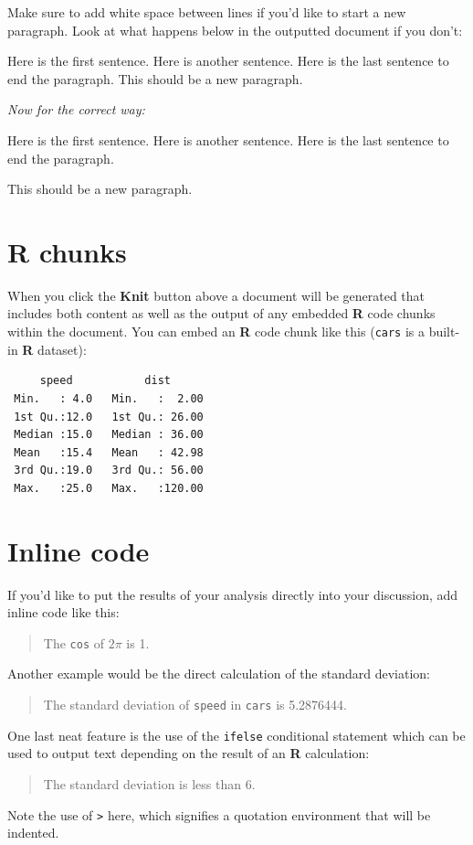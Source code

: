 \documentclass[12pt,twoside]{reedthesis}
\begin{document}
Make sure to add white space between lines if you'd like to start a new paragraph. Look at what happens below in the outputted document if you don't:

Here is the first sentence. Here is another sentence. Here is the last sentence to end the paragraph.
This should be a new paragraph.

\emph{Now for the correct way:}

Here is the first sentence. Here is another sentence. Here is the last sentence to end the paragraph.

This should be a new paragraph.

\hypertarget{r-chunks}{%
\section{R chunks}\label{r-chunks}}

When you click the \textbf{Knit} button above a document will be generated that includes both content as well as the output of any embedded \textbf{R} code chunks within the document. You can embed an \textbf{R} code chunk like this (\texttt{cars} is a built-in \textbf{R} dataset):
\begin{verbatim}
     speed           dist       
 Min.   : 4.0   Min.   :  2.00  
 1st Qu.:12.0   1st Qu.: 26.00  
 Median :15.0   Median : 36.00  
 Mean   :15.4   Mean   : 42.98  
 3rd Qu.:19.0   3rd Qu.: 56.00  
 Max.   :25.0   Max.   :120.00  
\end{verbatim}
\hypertarget{inline-code}{%
\section{Inline code}\label{inline-code}}

If you'd like to put the results of your analysis directly into your discussion, add inline code like this:
\begin{quote}
The \texttt{cos} of \(2 \pi\) is 1.
\end{quote}
Another example would be the direct calculation of the standard deviation:
\begin{quote}
The standard deviation of \texttt{speed} in \texttt{cars} is 5.2876444.
\end{quote}
One last neat feature is the use of the \texttt{ifelse} conditional statement which can be used to output text depending on the result of an \textbf{R} calculation:
\begin{quote}
The standard deviation is less than 6.
\end{quote}
Note the use of \texttt{\textgreater{}} here, which signifies a quotation environment that will be indented.
\end{document}
